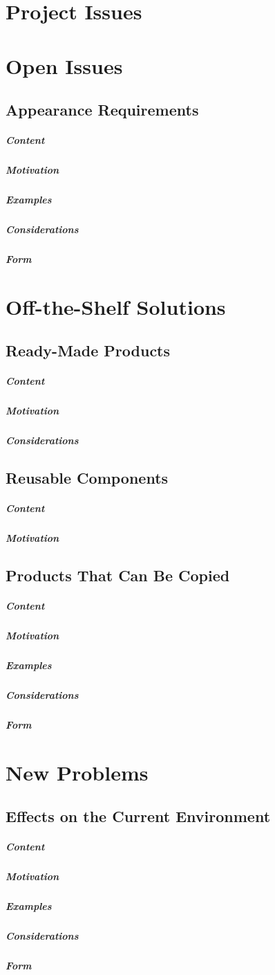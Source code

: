 \documentclass{article}
\begin{document}
\section*{Project Issues}

\section{Open Issues}
\subsection{Appearance Requirements}
\subparagraph{Content}
\subparagraph{Motivation}
\subparagraph{Examples}
\subparagraph{Considerations}
\subparagraph{Form}

\section{Off-the-Shelf Solutions}

\subsection{Ready-Made Products}
\subparagraph{Content}
\subparagraph{Motivation}
\subparagraph{Considerations}

\subsection{Reusable Components}
\subparagraph{Content}
\subparagraph{Motivation}

\subsection{Products That Can Be Copied}
\subparagraph{Content}
\subparagraph{Motivation}
\subparagraph{Examples}
\subparagraph{Considerations}
\subparagraph{Form}

\section{New Problems}

\subsection{Effects on the Current Environment}
\subparagraph{Content}
\subparagraph{Motivation}
\subparagraph{Examples}
\subparagraph{Considerations}
\subparagraph{Form}
\end{document}
